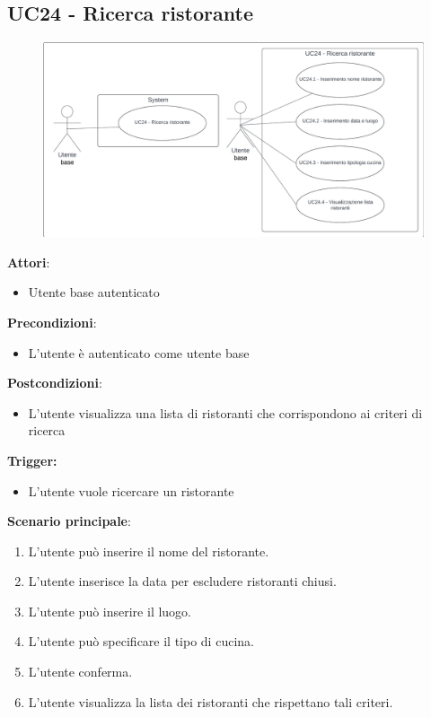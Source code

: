 \subsection{UC24 - Ricerca ristorante}\label{usecase:24}

\begin{figure}[H]
    \centering
    \includegraphics[width=0.9\linewidth]{ucd/UCD24.png}
\end{figure}

\textbf{Attori}:
\begin{itemize}
    \item Utente base autenticato
\end{itemize}
\textbf{Precondizioni}:
\begin{itemize}
    \item L'utente è autenticato come utente base
\end{itemize}
\textbf{Postcondizioni}:
\begin{itemize}
    \item L'utente visualizza una lista di ristoranti che corrispondono ai criteri di ricerca
\end{itemize}
\textbf{Trigger:}
\begin{itemize}
    \item L'utente vuole ricercare un ristorante
\end{itemize}
\textbf{Scenario principale}:
\begin{enumerate}
    \item L'utente può inserire il nome del ristorante.
    \item L'utente inserisce la data per escludere ristoranti chiusi.
    \item L'utente può inserire il luogo.
    \item L'utente può specificare il tipo di cucina.
    \item L'utente conferma.
    \item L'utente visualizza la lista dei ristoranti che rispettano tali criteri.
\end{enumerate}

